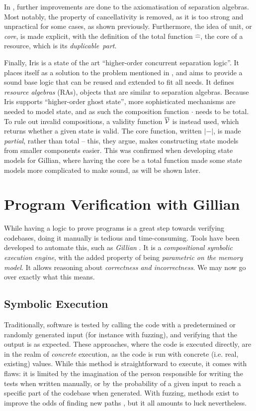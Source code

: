 In \cite{statesoundness}, further improvements are done to the axiomatisation of separation algebras. Most notably, the property of cancellativity is removed, as it is too strong and unpractical for some cases, as shown previously. Furthermore, the idea of unit, or \emph{core}, is made explicit, with the definition of the total function $\hat-$, the core of a resource, which is its \emph{duplicable~part}.

Finally, Iris \cite{iris1,iris2,iris3,iris} is a state of the art ``higher-order concurrent separation logic''. It places itself as a solution to the problem mentioned in \cite{next700seplogics}, and aims to provide a sound base logic that can be reused and extended to fit all needs. It defines \emph{resource algebras} (RAs), objects that are similar to separation algebras. Because Iris supports ``higher-order ghost state'', more sophisticated mechanisms are needed to model state, and as such the composition function $\cdot$ needs to be total. To rule out invalid compositions, a validity function $\overline{\cal V}$ is instead used, which returns whether a given state is valid. The core function, written $|-|$, is made \emph{partial}, rather than total -- this, they argue, makes constructing state models from smaller components easier. This was confirmed when developing state models for Gillian, where having the core be a total function made some state models more complicated to make sound, as will be shown later.

\section{Program Verification with Gillian} \label{sec:gillianverif}

While having a logic to prove programs is a great step towards verifying codebases, doing it manually is tedious and time-consuming. Tools have been developed to automate this, such as \emph{Gillian} \cite{gillian0, gillian1, gillian2}. It is a \emph{compositional symbolic execution engine}, with the added property of being \emph{parametric on the memory model}. It allows reasoning about \emph{correctness and incorrectness}. We may now go over exactly what this means.

\subsection{Symbolic Execution}

Traditionally, software is tested by calling the code with a predetermined or randomly generated input (for instance with fuzzing), and verifying that the output is as expected. These approaches, where the code is executed directly, are in the realm of \emph{concrete} execution, as the code is run with concrete (i.e. real, existing) values. While this method is straightforward to execute, it comes with flaws: it is limited by the imagination of the person responsible for writing the tests when written manually, or by the probability of a given input to reach a specific part of the codebase when generated. With fuzzing, methods exist to improve the odds of finding new paths \cite{smartfuzzing}, but it all amounts to luck nevertheless.

